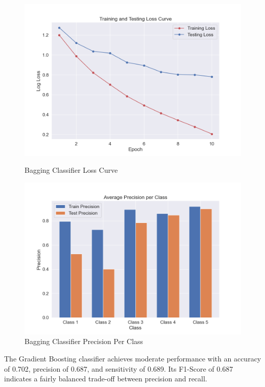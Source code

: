 \begin{figure}[H]
	\vspace{1em}
	
	\begin{minipage}[t]{0.48\textwidth}
		\centering
		\includegraphics[width=\textwidth]{img/paper_1/loss_curve.png}
		\caption{Bagging Classifier Loss Curve}
	\end{minipage}
	\hfill
	\begin{minipage}[t]{0.48\textwidth}
		\centering
		\includegraphics[width=\textwidth]{img/paper_1/precision_per_class.png}
		\caption{Bagging Classifier Precision Per Class}
	\end{minipage}
\end{figure}

The Gradient Boosting classifier achieves moderate performance with an accuracy of 0.702, precision of 0.687, and sensitivity of 0.689. Its F1-Score of 0.687 indicates a fairly balanced trade-off between precision and recall.


